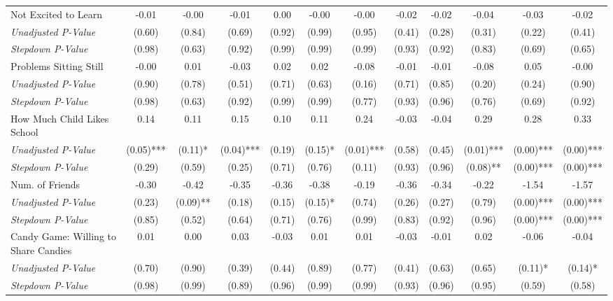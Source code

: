 \begin{tabular}{l c c c c c c c c c c c}
Not Excited to Learn & -0.01 & -0.00 & -0.01 & 0.00 & -0.00 & -0.00 & -0.02 & -0.02 & -0.04 & -0.03 & -0.02 \\
\quad \textit{Unadjusted P-Value} & (0.60) & (0.84) & (0.69) & (0.92) & (0.99) & (0.95) & (0.41) & (0.28) & (0.31) & (0.22) & (0.41) \\
\quad \textit{Stepdown P-Value} & (0.98) & (0.63) & (0.92) & (0.99) & (0.99) & (0.99) & (0.93) & (0.92) & (0.83) & (0.69) & (0.65) \\
Problems Sitting Still & -0.00 & 0.01 & -0.03 & 0.02 & 0.02 & -0.08 & -0.01 & -0.01 & -0.08 & 0.05 & -0.00 \\
\quad \textit{Unadjusted P-Value} & (0.90) & (0.78) & (0.51) & (0.71) & (0.63) & (0.16) & (0.71) & (0.85) & (0.20) & (0.24) & (0.90) \\
\quad \textit{Stepdown P-Value} & (0.98) & (0.63) & (0.92) & (0.99) & (0.99) & (0.77) & (0.93) & (0.96) & (0.76) & (0.69) & (0.92) \\
How Much Child Likes School & 0.14 & 0.11 & 0.15 & 0.10 & 0.11 & 0.24 & -0.03 & -0.04 & 0.29 & 0.28 & 0.33 \\
\quad \textit{Unadjusted P-Value} & (0.05)*** & (0.11)* & (0.04)*** & (0.19) & (0.15)* & (0.01)*** & (0.58) & (0.45) & (0.01)*** & (0.00)*** & (0.00)*** \\
\quad \textit{Stepdown P-Value} & (0.29) & (0.59) & (0.25) & (0.71) & (0.76) & (0.11) & (0.93) & (0.96) & (0.08)** & (0.00)*** & (0.00)*** \\
Num. of Friends & -0.30 & -0.42 & -0.35 & -0.36 & -0.38 & -0.19 & -0.36 & -0.34 & -0.22 & -1.54 & -1.57 \\
\quad \textit{Unadjusted P-Value} & (0.23) & (0.09)** & (0.18) & (0.15) & (0.15)* & (0.74) & (0.26) & (0.27) & (0.79) & (0.00)*** & (0.00)*** \\
\quad \textit{Stepdown P-Value} & (0.85) & (0.52) & (0.64) & (0.71) & (0.76) & (0.99) & (0.83) & (0.92) & (0.96) & (0.00)*** & (0.00)*** \\
Candy Game: Willing to Share Candies & 0.01 & 0.00 & 0.03 & -0.03 & 0.01 & 0.01 & -0.03 & -0.01 & 0.02 & -0.06 & -0.04 \\
\quad \textit{Unadjusted P-Value} & (0.70) & (0.90) & (0.39) & (0.44) & (0.89) & (0.77) & (0.41) & (0.63) & (0.65) & (0.11)* & (0.14)* \\
\quad \textit{Stepdown P-Value} & (0.98) & (0.99) & (0.89) & (0.96) & (0.99) & (0.99) & (0.93) & (0.96) & (0.95) & (0.59) & (0.58) \\
\bottomrule
\end{tabular}

